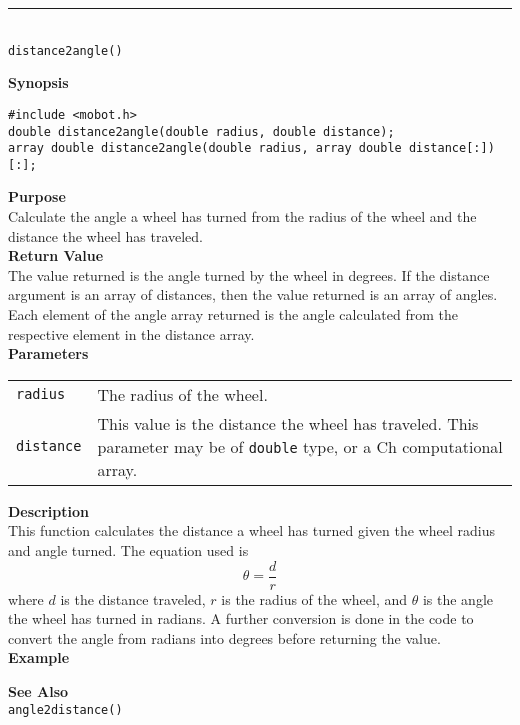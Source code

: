 \noindent
\vspace{5pt}
\rule{4.5in}{0.015in}\\
\noindent
{\LARGE \texttt{distance2angle()}}\\
{}

\noindent
{\bf Synopsis}
\vspace{-8pt}
\begin{verbatim}
#include <mobot.h>
double distance2angle(double radius, double distance);
array double distance2angle(double radius, array double distance[:])[:];
\end{verbatim}

\noindent
{\bf Purpose}\\
Calculate the angle a wheel has turned from the radius of the wheel and
the distance the wheel has traveled.\\

\noindent
{\bf Return Value}\\
The value returned is the angle turned by the wheel in degrees. If the distance argument is an
array of distances, then the value returned is an array of angles. Each element
of the angle array returned is the angle calculated from the respective
element in the distance array.\\

\noindent
{\bf Parameters}
\vspace{-0.1in}
\begin{description}
\item               
\begin{tabular}{p{15 mm}p{145 mm}}
\texttt{radius} & The radius of the wheel. \\
\texttt{distance} & This value is the distance the wheel has traveled. This parameter may be of \texttt{double} type, or a Ch computational array. \\
\end{tabular}
\end{description}

\noindent
{\bf Description}\\
This function calculates the distance a wheel has turned given the wheel 
radius and angle turned. The equation used is
\begin{equation*}
\theta = \frac{d}{r}
\end{equation*}
where $d$ is the distance traveled, $r$ is the radius of the wheel, and $\theta$ is
the angle the wheel has turned in radians. A further conversion is done in the code to
convert the angle from radians into degrees before returning the value.
\\

\noindent
{\bf Example}\\
\noindent

\noindent
{\bf See Also}\\
\texttt{angle2distance()}

